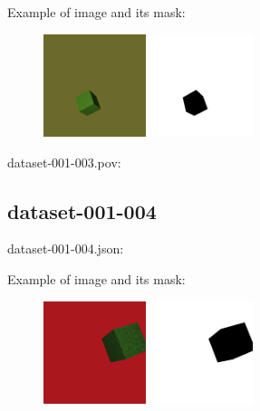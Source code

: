 Example of image and its mask:
\begin{center}
\begin{figure}[H]
\centering\includegraphics[width=3cm]{./img-001-003.png}
\centering\includegraphics[width=3cm]{./mask-001-003.png}
\end{figure}
\end{center}

dataset-001-003.pov:
\begin{scriptsize}
\begin{ttfamily}

\end{ttfamily}
\end{scriptsize}

\subsection{dataset-001-004}

dataset-001-004.json:
\begin{scriptsize}
\begin{ttfamily}

\end{ttfamily}
\end{scriptsize}

Example of image and its mask:
\begin{center}
\begin{figure}[H]
\centering\includegraphics[width=3cm]{./img-001-004.png}
\centering\includegraphics[width=3cm]{./mask-001-004.png}
\end{figure}
\end{center}

